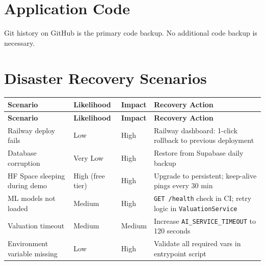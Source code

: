 \documentclass[12pt,a4paper]{report}
\begin{document}
\section{Application Code}

Git history on GitHub is the primary code backup. No additional code
backup is necessary.

\section{Disaster Recovery Scenarios}

\begin{longtable}{L{3.5cm} C{1.8cm} C{1.8cm} L{4cm}}
    \toprule
    \textbf{Scenario} & \textbf{Likelihood} & \textbf{Impact} & \textbf{Recovery Action} \\
    \midrule
    \endfirsthead
    \toprule
    \textbf{Scenario} & \textbf{Likelihood} & \textbf{Impact} & \textbf{Recovery Action} \\
    \midrule
    \endhead
    \bottomrule
    \endlastfoot

    Railway deploy fails &
    \textcolor{warningorange}{Low} &
    \textcolor{dangerred}{High} &
    Railway dashboard: 1-click rollback to previous deployment \\[6pt]

    Database corruption &
    \textcolor{successgreen}{Very Low} &
    \textcolor{dangerred}{High} &
    Restore from Supabase daily backup \\[6pt]

    HF Space sleeping during demo &
    \textcolor{dangerred}{High (free tier)} &
    \textcolor{dangerred}{High} &
    Upgrade to persistent; keep-alive pings every 30 min \\[6pt]

    ML models not loaded &
    \textcolor{warningorange}{Medium} &
    \textcolor{dangerred}{High} &
    \texttt{GET /health} check in CI; retry logic in \texttt{ValuationService} \\[6pt]

    Valuation timeout &
    \textcolor{warningorange}{Medium} &
    \textcolor{warningorange}{Medium} &
    Increase \texttt{AI\_SERVICE\_TIMEOUT} to 120 seconds \\[6pt]

    Environment variable missing &
    \textcolor{successgreen}{Low} &
    \textcolor{dangerred}{High} &
    Validate all required vars in entrypoint script \\[6pt]


\end{longtable}
\end{document}
